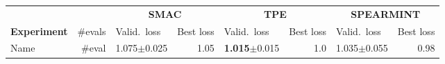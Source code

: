 \documentclass[landscape]{article} %
\begin{document}
\begin{table}[t]
\begin{tabularx}{\textwidth}{lr|Xr|Xr|Xr}
\toprule
\multicolumn{2}{l}{}&\multicolumn{2}{c}{\bf SMAC}&\multicolumn{2}{c}{\bf TPE}&\multicolumn{2}{c}{\bf SPEARMINT}\\
\multicolumn{1}{l}{\bf Experiment} &\multicolumn{1}{r}{\#evals}&\multicolumn{1}{l}{Valid.\ loss} &\multicolumn{1}{r}{Best loss}&\multicolumn{1}{l}{Valid.\ loss} &\multicolumn{1}{r}{Best loss}&\multicolumn{1}{l}{Valid.\ loss} &\multicolumn{1}{r}{Best loss}\\
\toprule
Name & \#eval & 1.075$\pm$0.025 & 1.05 & \textbf{1.015}$\pm$0.015 & 1.0 & 1.035$\pm$0.055 & 0.98 \\
\bottomrule
\end{tabularx}
\end{table}
\end{document}
